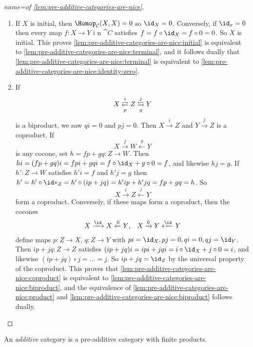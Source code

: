 \documentclass[../main.tex]{subfiles}
\begin{document}
\begin{proof}[name={of \cref{lem:pre-additive-categories-are-nice}}]
  \begin{enumerate}
      \item If $X$ is initial, then $\Hom_{\cat C}(X, X) = 0$ so $\id_X = 0$.
    Conversely, if $\id_x = 0$ then every map $f\colon X \to Y$ i n $\cat C$ satisfies $f = f \circ \id_X = f \circ 0 = 0$. So $X$ is initial. This proves \cref{lem:pre-additive-categories-are-nice:initial} is equivalent to \cref{lem:pre-additive-categories-are-nice:terminal}, and it follows dually that \cref{lem:pre-additive-categories-are-nice:terminal} is equivalent to \cref{lem:pre-additive-categories-are-nice:identity-zero}.
    \item If \[X \xrightleftarrows{i}[p] Z \xleftrightarrows{j}[q] Y\] is a biproduct, we saw $qi = 0$ and $pj = 0$. Then $X \xrightarrow{i} Z$ and $Y \xrightarrow{j} Z$ is a coproduct. If \[X \xrightarrow{f} W \xleftarrow{g} Y\] is any cocone, set $h = fp + gq\colon Z \to W$. Then $hi = (fp + gq)i = fpi + gqi = f \circ \id_X + g \circ 0 = f$, and likewise $hj = g$. If $h'\colon Z \to W$ satisfies $h'i = f$ and $h'j = g$ then $h' = h' \circ \id*_Z = h' \circ (ip + jq) = h'ip + h'jq = fp + gq = h$. So \[X \xrightarrow{i} Z \xleftarrow{j} Y\] form a coproduct. Conversely, if these maps form a coproduct, then the cocones 
    \begin{align*}
          X \xrightarrow{\id} X \xleftarrow{0} Y\text{,} && X \xrightarrow{0} Y \xleftarrow{\id} Y      
    \end{align*}
    define maps $p\colon Z \to X$, $q\colon Z \to Y$ with $pi = \id_X, pj = 0, qi = 0, qj = \id_Y$. Then $ip + jq\colon Z \to Z$ satisfies $(ip + jq)i = ipi + jqi = i \circ \id_X + j \circ 0 = i$, and likewise $(ip + jq)\circ j = \ldots = j$. So $ip + jq = \id_Z$ by the universal property of the coproduct. This proves that \cref{lem:pre-additive-categories-are-nice:coproduct} is equivalent to \cref{lem:pre-additive-categories-are-nice:biproduct}, and the equivalence of \cref{lem:pre-additive-categories-are-nice:product} and \cref{lem:pre-additive-categories-are-nice:biproduct} follows dually. \qedhere
    \end{enumerate}
\end{proof}
\begin{defn}
  An \emph{additive} category is a pre-additive category with finite products.
\end{defn}
\end{document}
